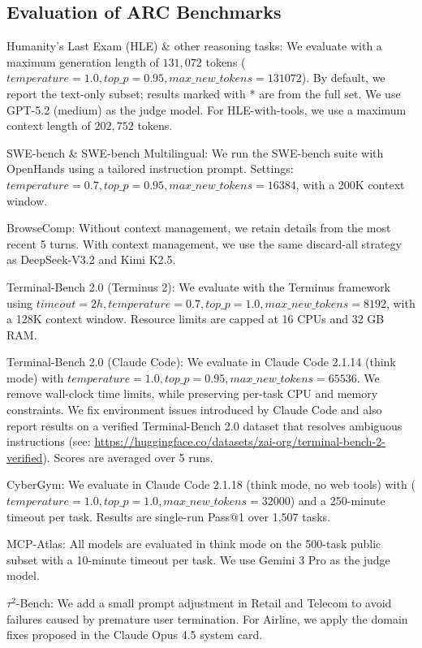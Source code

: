 \subsection{Evaluation of ARC Benchmarks}
\label{sec:eval_details_arc}
Humanity’s Last Exam (HLE) \& other reasoning tasks: We evaluate with a maximum generation length of $131,072$ tokens ($temperature=1.0, top\_p=0.95, max\_new\_tokens=131072$). By default, we report the text-only subset; results marked with * are from the full set. We use GPT-5.2 (medium) as the judge model. For HLE-with-tools, we use a maximum context length of $202,752$ tokens.

SWE-bench \& SWE-bench Multilingual: We run the SWE-bench suite with OpenHands using a tailored instruction prompt. Settings: $temperature=0.7, top\_p=0.95, max\_new\_tokens=16384$, with a 200K context window.

BrowseComp: Without context management, we retain details from the most recent 5 turns. With context management, we use the same discard-all strategy as DeepSeek-V3.2 and Kimi K2.5.

Terminal-Bench 2.0 (Terminus 2): We evaluate with the Terminus framework using $timeout=2h, temperature=0.7, top\_p=1.0, max\_new\_tokens=8192$, with a 128K context window. Resource limits are capped at 16 CPUs and 32 GB RAM.

Terminal-Bench 2.0 (Claude Code): We evaluate in Claude Code 2.1.14 (think mode) with $temperature=1.0, top\_p=0.95, max\_new\_tokens=65536$. We remove wall-clock time limits, while preserving per-task CPU and memory constraints. We fix environment issues introduced by Claude Code and also report results on a verified Terminal-Bench 2.0 dataset that resolves ambiguous instructions (see: \url{https://huggingface.co/datasets/zai-org/terminal-bench-2-verified}). Scores are averaged over 5 runs.

CyberGym: We evaluate in Claude Code 2.1.18 (think mode, no web tools) with ($temperature=1.0, top\_p=1.0, max\_new\_tokens=32000$) and a 250-minute timeout per task. Results are single-run Pass@1 over 1,507 tasks.

MCP-Atlas: All models are evaluated in think mode on the 500-task public subset with a 10-minute timeout per task. We use Gemini 3 Pro as the judge model.

$\tau^2$-Bench: We add a small prompt adjustment in Retail and Telecom to avoid failures caused by premature user termination. For Airline, we apply the domain fixes proposed in the Claude Opus 4.5 system card.

